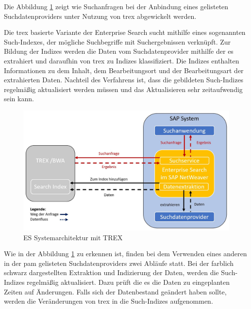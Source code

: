 Die Abbildung \ref{fig:ESBWA} zeigt wie Suchanfragen bei der Anbindung eines gelisteten Suchdatenproviders unter Nutzung von \ac{trex} abgewickelt werden.


Die \ac{trex} basierte Variante der Enterprise Search sucht mithilfe eines sogenannten Such-Indexes, der mögliche Suchbegriffe mit Suchergebnissen verknüpft. Zur Bildung der Indizes werden die Daten vom Suchdatenprovider mithilfe der \ac{es} extrahiert und daraufhin von \ac{trex} zu Indizes klassifiziert. Die Indizes enthalten Informationen zu dem Inhalt, dem Bearbeitungsort und der Bearbeitungsart der extrahierten Daten. Nachteil des Verfahrens ist, dass die gebildeten Such-Indizes regelmäßig aktualisiert werden müssen und das Aktualisieren sehr zeitaufwendig sein kann.\autocite[Vgl.][]{ESBWA}

\begin{figure}[h]
    \centering
    \includegraphics[width=1\textwidth]{img/ES_TREXselbstSuchdatenanbieter.JPG}
    \caption[ES Systemarchitektur mit TREX]{ES Systemarchitektur mit TREX\autocite[Vgl.]{ESBWA}}
    \label{fig:ESBWA}
\end{figure}


\newpage
Wie in der Abbildung \ref{fig:ESBWA} zu erkennen ist, finden bei dem Verwenden eines anderen in der \ac{pam} gelisteten Suchdatenproviders zwei Abläufe statt. Bei der farblich schwarz dargestellten Extraktion und Indizierung der Daten, werden die Such-Indizes regelmäßig aktualisiert. Dazu prüft die \ac{es} die Daten zu eingeplanten Zeiten auf Änderungen. Falls sich der Datenbestand geändert haben sollte, werden die Veränderungen von \ac{trex} in die Such-Indizes aufgenommen.\autocite[Vgl.][]{ESBWA}

